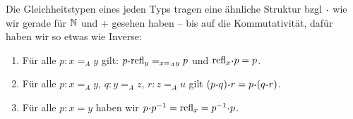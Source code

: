 Die Gleichheitstypen eines jeden Typs tragen eine ähnliche Struktur bzgl $\kon$ wie wir gerade für $\mathbb{N}$ und $+$ gesehen haben -- bis auf die Kommutativität, dafür haben wir so etwas wie Inverse:

\begin{lemma}
\begin{enumerate}
\item Für alle $ p:x=_Ay$ gilt: $ p\kon\refl_y=_{x=_Ay} p$ und $\refl_x\kon p= p$.
\item Für alle $ p:x=_Ay$, $ q:y=_Az$, $ r:z=_Au$ gilt
   $( p\kon q)\kon r= p\kon( q\kon r)$.
\item Für alle $ p:x=y$ haben wir $ p\kon p^{-1}=\refl_x= p^{-1}\kon p$.
\end{enumerate}
\end{lemma}

